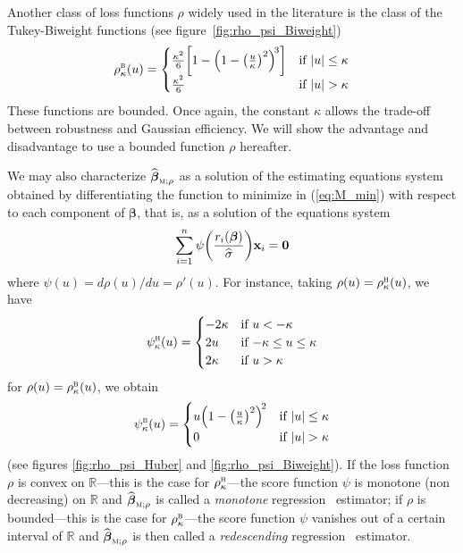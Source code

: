 Another class of loss functions $\rho$ widely used in the literature is the
class of the Tukey-Biweight                                                      
functions (see figure~\ref{fig:rho_psi_Biweight})
%
\begin{equation}
    \label{eq:Tukey_Biweight_function}
    \rho_\kappa^\stsc{B}(u) = 
        \begin{cases}
            \frac{\kappa^2}{6} \left[1 - \left(1 - \left(\frac{u}{\kappa}\right)^{2}\right)^{\!3}\right] 
                & \text{if $|u| \leq \kappa$}\\
            \frac{\kappa^2}{6} 
                & \text{if $|u| > \kappa$}
        \end{cases}
\end{equation}
%
These functions are bounded. Once again, the constant $\kappa$ allows the
trade-off between robustness and Gaussian efficiency. We will show the
advantage and disadvantage to use a bounded function $\rho$ hereafter.

We may also characterize $\sthat{\boldsymbol\beta}_{\stsc{M};\rho}$ as a
solution of the estimating equations system obtained by differentiating the
function to minimize in (\ref{eq:M_min}) with respect to each component of
$\boldsymbol\beta$, that is, as a solution of the equations system
%
\begin{equation}\label{eq:M_equations}
    \sum_{i=1}^{n} \psi\left(\frac{r_i(\boldsymbol\beta)}{\sthat{\sigma}}\right) \stvec{x}_i = \stvec{0}
\end{equation}
%
where $\psi(u) = d\rho(u) / du = \rho'(u)$. For instance, taking
$\rho(u)=\rho_{\kappa}^{\stsc{H}}(u)$, we have
\[
    \psi_{\kappa}^{\stsc{H}}(u) = 
    \begin{cases}
        -2\kappa    & \text{if $u<-\kappa$}\\
        2u          & \text{if $-\kappa\leq u\leq\kappa$}\\
        2\kappa     & \text{if $u>\kappa$}
    \end{cases}
\]
for $\rho(u) = \rho_{\kappa}^{\stsc{B}}(u)$, we obtain
\[
    \psi_{\kappa}^{\stsc{B}}(u) =
    \begin{cases}
        u\left(1 - \left(\frac{u}{\kappa}\right)^2\right)^{\!2} & \text{if $|u| \leq \kappa$}\\
        0                                                       & \text{if $|u| > \kappa$}
    \end{cases}
\]
(see figures \ref{fig:rho_psi_Huber} and \ref{fig:rho_psi_Biweight}). If the
loss function $\rho$ is convex on $\mathbb{R}$---this is the case for
$\rho_{\kappa}^{\stsc{H}}$---the score function $\psi$ is monotone (non
decreasing) on $\mathbb{R}$ and $\sthat{\boldsymbol\beta}_{\stsc{M};\rho}$ is
called a \emph{monotone} regression ~estimator; if $\rho$ is
bounded---this is the case for $\rho_{\kappa}^{\stsc{B}}$---the score function
$\psi$ vanishes out of a certain interval of $\mathbb{R}$ and
$\sthat{\boldsymbol\beta}_{\stsc{M};\rho}$ is then called a \emph{redescending}
regression ~estimator.


